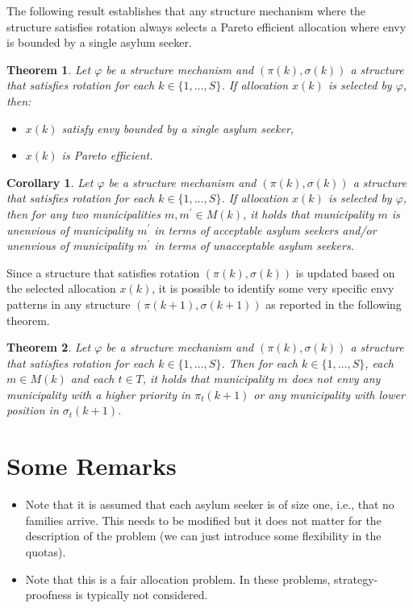 \documentclass[12pt,fleqn]{article}
\newtheorem{theorem}{Theorem}
\newtheorem{corollary}{Corollary}
\begin{document}
\noindent The following result establishes that any structure mechanism where the structure satisfies rotation always selects a Pareto efficient allocation where envy is bounded by a single asylum seeker.

\begin{theorem}\rm\label{THEOREM:envy_efficiency}
Let $\varphi$ be a structure mechanism and $(\pi(k),\sigma(k))$ a structure that satisfies rotation for each $k\in \{1,\ldots,S\}$. If allocation $x(k)$ is selected by $\varphi$, then:
\begin{itemize}
\item[(i)] $x(k)$ satisfy envy bounded by a single asylum seeker,
\item[(ii)] $x(k)$ is Pareto efficient.
\end{itemize}
\end{theorem}
\begin{corollary}\rm\label{COROLLARY:envy}
Let $\varphi$ be a structure mechanism and $(\pi(k),\sigma(k))$ a structure that satisfies rotation for each $k\in \{1,\ldots,S\}$. If allocation $x(k)$ is selected by $\varphi$, then for any two municipalities $m,m^\prime\in M(k)$, it holds that municipality $m$ is unenvious of municipality $m^\prime$ in terms of acceptable asylum seekers and/or unenvious of municipality $m^\prime$ in terms of unacceptable asylum seekers.
\end{corollary}

\noindent Since a structure that satisfies rotation $(\pi(k),\sigma(k))$ is updated based on the selected allocation $x(k)$, it is possible to identify some very specific envy patterns in any structure $(\pi(k+1),\sigma(k+1))$ as reported in the following theorem.
\begin{theorem}\rm\label{TH:structures}
Let $\varphi$ be a structure mechanism and $(\pi(k),\sigma(k))$ a structure that satisfies rotation for each $k\in \{1,\ldots,S\}$. Then for each
$k\in\{1,\ldots,S\}$, each $m\in M(k)$ and each $t\in T$, it holds that municipality $m$ does not envy any
municipality with a higher priority in $\pi_t(k+1)$ or any municipality with lower position in $\sigma_t(k+1)$.
\end{theorem}

\section{Some Remarks}

\begin{itemize}
\item Note that it is assumed that each asylum seeker is of size one, i.e., that no families arrive. This needs to be modified but it does not matter for the description of the problem (we can just introduce some flexibility in the quotas).
\item Note that this is a fair allocation problem. In these problems, strategy-proofness is typically not considered.
\end{itemize}
\end{document}

